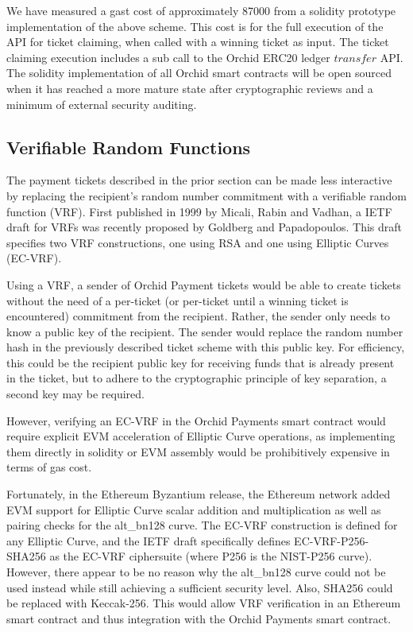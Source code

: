 We have measured a gast cost of approximately 87000 from a solidity prototype implementation of the above scheme. This cost is for the full execution of the API for ticket claiming, when called with a winning ticket as input. The ticket claiming execution includes a sub call to the Orchid ERC20 ledger $transfer$ API. The solidity implementation of all Orchid smart contracts will be open sourced when it has reached a more mature state after cryptographic reviews and a minimum of external security auditing.

\subsection{Verifiable Random Functions}
\label{sec:vrfs}

The payment tickets described in the prior section can be made less interactive by replacing the recipient's random number commitment with a verifiable random function (VRF). First published in 1999 by Micali, Rabin and Vadhan\cite{VRF}, a IETF draft for VRFs was recently proposed by Goldberg and Papadopoulos\cite{IETFVRF}. This draft specifies two VRF constructions, one using RSA and one using Elliptic Curves (EC-VRF).

Using a VRF, a sender of Orchid Payment tickets would be able to create tickets without the need of a per-ticket (or per-ticket until a winning ticket is encountered) commitment from the recipient. Rather, the sender only needs to know a public key of the recipient. The sender would replace the random number hash in the previously described ticket scheme with this public key. For efficiency, this could be the recipient public key for receiving funds that is already present in the ticket, but to adhere to the cryptographic principle of key separation, a second key may be required.

However, verifying an EC-VRF in the Orchid Payments smart contract would require explicit EVM acceleration of Elliptic Curve operations, as implementing them directly in solidity or EVM assembly would be prohibitively expensive in terms of gas cost.

Fortunately, in the Ethereum Byzantium\cite{ETHByz} release, the Ethereum network added EVM support for Elliptic Curve scalar addition and multiplication\cite{EIP196} as well as pairing checks\cite{EIP197} for the alt\_bn128 curve\cite{ALTBN128}. The EC-VRF construction is defined for any Elliptic Curve, and the IETF draft specifically defines EC-VRF-P256-SHA256 as the EC-VRF ciphersuite (where P256 is the NIST-P256 curve\cite{P256}). However, there appear to be no reason why the alt\_bn128 curve could not be used instead while still achieving a sufficient security level. Also, SHA256 could be replaced with Keccak-256. This would allow VRF verification in an Ethereum smart contract and thus integration with the Orchid Payments smart contract.

